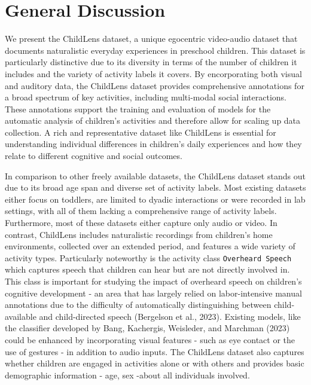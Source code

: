 \documentclass[
  man,floatsintext]{apa6}
\begin{document}
\section{General Discussion}\label{general-discussion}

We present the ChildLens dataset, a unique egocentric video-audio dataset that documents naturalistic everyday experiences in preschool children. This dataset is particularly distinctive due to its diversity in terms of the number of children it includes and the variety of activity labels it covers. By encorporating both visual and auditory data, the ChildLens dataset provides comprehensive annotations for a broad spectrum of key activities, including multi-modal social interactions. These annotations support the training and evaluation of models for the automatic analysis of children's activities and therefore allow for scaling up data collection. A rich and representative dataset like ChildLens is essential for understanding individual differences in children's daily experiences and how they relate to different cognitive and social outcomes.

In comparison to other freely available datasets, the ChildLens dataset stands out due to its broad age span and diverse set of activity labels. Most existing datasets either focus on toddlers, are limited to dyadic interactions or were recorded in lab settings, with all of them lacking a comprehensive range of activity labels. Furthermore, most of these datasets either capture only audio or video. In contrast, ChildLens includes naturalistic recordings from children's home environments, collected over an extended period, and features a wide variety of activity types. Particularly noteworthy is the activity class \texttt{Overheard\ Speech} which captures speech that children can hear but are not directly involved in. This class is important for studying the impact of overheard speech on children's cognitive development - an area that has largely relied on labor-intensive manual annotations due to the difficulty of automatically distinguishing between child-available and child-directed speech (Bergelson et al., 2023). Existing models, like the classifier developed by Bang, Kachergis, Weisleder, and Marchman (2023) could be enhanced by incorporating visual features - such as eye contact or the use of gestures - in addition to audio inputs. The ChildLens dataset also captures whether children are engaged in activities alone or with others and provides basic demographic information - age, sex -about all individuals involved.
\end{document}
